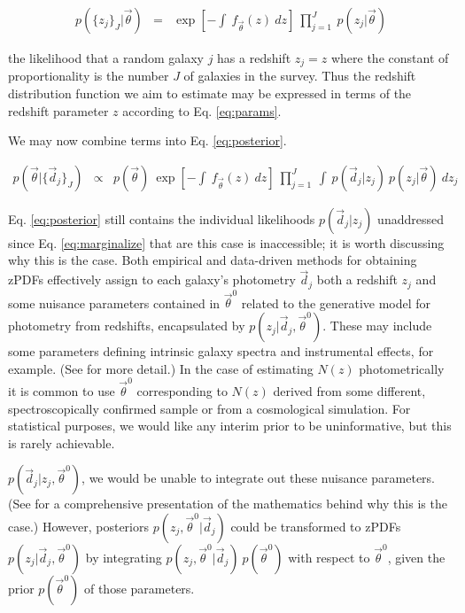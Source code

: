 \documentclass[preprint]{aastex}
\begin{document}
\begin{eqnarray}
\label{eq:indie}
p(\{z_{j}\}_{J}|\vec{\theta}) &=& \exp\left[-\int\ f_{\vec{\theta}}(z)\ 
dz\right]\ \prod_{j=1}^{J}\ p(z_{j}|\vec{\theta})
\end{eqnarray}

the likelihood that a random galaxy $j$ has a redshift $z_{j}=z$ where the 
constant of proportionality is the number $J$ of galaxies in the survey.  Thus 
the redshift distribution function we aim to estimate may be expressed in terms 
of the redshift parameter $z$ according to Eq. \ref{eq:params}.  

We may now combine terms into Eq. \ref{eq:posterior}.

\begin{eqnarray}
\label{eq:posterior}
p(\vec{\theta}|\{\vec{d}_{j}\}_{J}) &\propto& p(\vec{\theta})\ \exp\left[-\int\ 
f_{\vec{\theta}}(z)\ dz\right]\ \prod_{j=1}^{J}\ \int\ p(\vec{d}_{j}|z_{j})\ 
p(z_{j}|\vec{\theta})\ dz_{j}
\end{eqnarray}

Eq. \ref{eq:posterior} still contains the individual likelihoods 
$p(\vec{d}_{j}|z_{j})$ unaddressed since Eq. \ref{eq:marginalize} that are this 
case is inaccessible; it is worth discussing why this is the case.  Both 
empirical and data-driven methods for obtaining zPDFs effectively assign to 
each galaxy's photometry $\vec{d}_{j}$ both a redshift $z_{j}$ and some 
nuisance parameters contained in $\vec{\theta}^{0}$ related to the generative 
model for photometry from redshifts, encapsulated by 
$p(z_{j}|\vec{d}_{j},\vec{\theta}^{0})$.  These may include some parameters 
defining intrinsic galaxy spectra and instrumental effects, for example. (See 
\citet{ben98} for more detail.)  In the case of estimating $N(z)$ 
photometrically it is common to use $\vec{\theta}^{0}$ corresponding to $N(z)$ 
derived from some different, spectroscopically confirmed sample or from a 
cosmological simulation.  For statistical purposes, we would like any interim 
prior to be uninformative, but this is rarely achievable.

$p(\vec{d}_{j}|z_{j},\vec{\theta}^{0})$, we would be unable to integrate out 
these nuisance parameters.  (See \citet{hog12} for a comprehensive presentation 
of the mathematics behind why this is the case.)  However, posteriors 
$p(z_{j},\vec{\theta}^{0}|\vec{d}_{j})$ could be transformed to zPDFs 
$p(z_{j}|\vec{d}_{j},\vec{\theta}^{0})$ by integrating 
$p(z_{j},\vec{\theta}^{0}|\vec{d}_{j})\ p(\vec{\theta}^{0})$ with respect to 
$\vec{\theta}^{0}$, given the prior  $p(\vec{\theta}^{0})$ of those parameters. 
 
\end{document}

